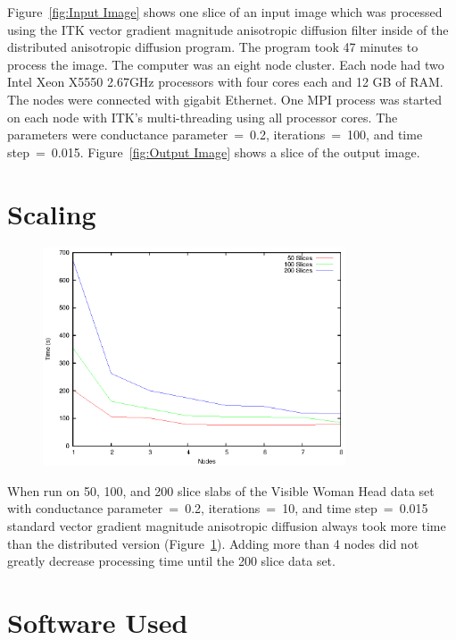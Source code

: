 \documentclass{InsightArticle}
\begin{document}
Figure~\ref{fig:Input Image} shows one slice of an input 
image which was processed using the ITK vector gradient 
magnitude anisotropic diffusion filter inside of the 
distributed anisotropic diffusion program. The program 
took 47 minutes to process the image. The computer was an 
eight node cluster. Each node had two Intel Xeon X5550 
2.67GHz processors with four cores each and 12 GB of RAM. 
The nodes were connected with gigabit Ethernet. One MPI 
process was started on each node with ITK's 
multi-threading using all processor cores. The parameters 
were conductance parameter~=~0.2, iterations~=~100, and 
time step~=~0.015. Figure~\ref{fig:Output Image} shows a 
slice of the output image.

\section{Scaling}

\begin{figure}
\center
\includegraphics[width=0.8\textwidth]{time.eps}
\label{fig:Processing Times}
\end{figure}

When run on 50, 100, and 200 slice slabs of the Visible 
Woman Head data set with conductance parameter~=~0.2, 
iterations~=~10, and time step~=~0.015 standard vector 
gradient magnitude anisotropic diffusion always took 
more time than the distributed version 
(Figure~\ref{fig:Processing Times}). Adding more than 4 
nodes did not greatly decrease processing time until the 
200 slice data set.

\section{Software Used}
\end{document}
